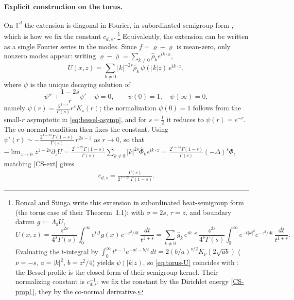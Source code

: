 \documentclass[12pt,a4paper,twoside]{article}
\newcommand{\vr}{\varrho}
\numberwithin{equation}{section}%
\begin{document}
\paragraph{Explicit construction on the torus.}
On $\mathbb T^d$ the extension is diagonal in Fourier, in subordinated semigroup form \cite[eq.~(3.4)]{RS2016}, which is how we fix the constant $c_{d,s}$.%
\footnote{Roncal and Stinga write this extension in subordinated heat-semigroup
	form (the torus case of their Theorem~1.1): with $\sigma=2s$, $\tau=z$, and
	boundary datum $g:=\Lambda_0 U$,
	\[
	U(x,z)=\frac{z^{2s}}{4^{s}\Gamma(s)}\int_0^\infty e^{t\Delta}g(x)\,
	e^{-z^2/4t}\,\frac{dt}{t^{1+s}}
	=\sum_{k\neq0}\hat g_k\,e^{ik\cdot x}\,\frac{z^{2s}}{4^{s}\Gamma(s)}
	\int_0^\infty e^{-t|k|^2}e^{-z^2/4t}\,\frac{dt}{t^{1+s}} .
	\]
	Evaluating the $t$-integral by
	$\int_0^\infty t^{\nu-1}e^{-at-b/t}\,dt=2(b/a)^{\nu/2}K_\nu(2\sqrt{ab})$
	($\nu=-s$, $a=|k|^2$, $b=z^2/4$) yields $\psi(|k|z)$, so \eqref{eq:torus-U}
	coincides with \cite[eq.~(3.4)]{RS2016}; the Bessel profile is the closed form
	of their semigroup kernel. Their normalizing constant is $c_{d,s}^{-1}$: we fix
	the constant by the Dirichlet energy \eqref{CS-prop1}, they by the co-normal
	derivative.}
Equivalently, the extension can be written as a single Fourier series in the modes. Since $f=\vr-\bar\vr$ is mean-zero, only nonzero modes appear: writing $\vr-\bar\vr=\sum_{k\neq0}\hat\rho_k e^{ik\cdot x}$,
\begin{equation}\label{eq:torus-U}
	U(x,z)=\sum_{k\neq0}|k|^{-2s}\hat\rho_k\,\psi(|k|z)\,e^{ik\cdot x},
\end{equation}
where $\psi$ is the unique decaying solution of
\begin{equation}\label{eq:profile}
	\psi''+\frac{1-2s}{r}\psi'-\psi=0,\qquad \psi(0)=1,\quad \psi(\infty)=0,
\end{equation}
namely $\psi(r)=\tfrac{2^{1-s}}{\Gamma(s)}r^{s}K_s(r)$; the normalization $\psi(0)=1$ follows from
the small-$r$ asymptotic in \eqref{eq:bessel-asymp}, and for $s=\tfrac12$ it reduces to
$\psi(r)=e^{-r}$. The co-normal condition then fixes the constant. Using $\psi'(r)\sim -\tfrac{2^{1-2s}\Gamma(1-s)}{\Gamma(s)}\,r^{2s-1}$ as $r\to0$, so that $-\lim_{z\to0}z^{1-2s}\partial_z U=\tfrac{2^{1-2s}\Gamma(1-s)}{\Gamma(s)}\sum_{k\neq0}|k|^{2s}\hat\Phi_k e^{ik\cdot x}=\tfrac{2^{1-2s}\Gamma(1-s)}{\Gamma(s)}(-\Delta)^s\Phi$, matching \eqref{CS-ext} gives
\begin{align}\label{constCDS}
	c_{d,s}=\frac{\Gamma(s)}{2^{1-2s}\,\Gamma(1-s)} .
\end{align}
\end{document}
